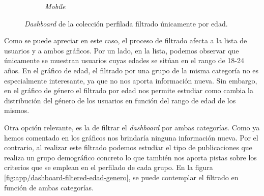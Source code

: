 \begin{figure}[H]
\begin{subfigure}{0.223\textwidth}
  \caption{\textit{Mobile}} 
  \end{subfigure}
  \caption{\textit{Dashboard} de la colección perfilada filtrado únicamente por edad.}
  \label{fig:app/dashboard-filtered}
\end{figure}

Como se puede apreciar en este caso, el proceso de filtrado afecta a la lista de usuarios y a ambos gráficos. Por un lado, en la lista, podemos observar que únicamente se muestran usuarios cuyas edades se sitúan en el rango de 18-24 años. En el gráfico de edad, el filtrado por una grupo de la misma categoría no es especialmente interesante, ya que no nos aporta información nueva. Sin embargo, en el gráfico de género el filtrado por edad nos permite estudiar como cambia la distribución del género de los usuarios en función del rango de edad de los mismos.

Otra opción relevante, es la de filtrar el \textit{dashboard} por ambas categorías. Como ya hemos comentado en los gráficos nos brindaría ninguna información nueva. Por el contrario, al realizar este filtrado podemos estudiar el tipo de publicaciones que realiza un grupo demográfico concreto lo que también nos aporta pistas sobre los criterios que se emplean en el perfilado de cada grupo. En la figura \ref{fig:app/dashboard-filtered-edad-genero}, se puede contemplar el filtrado en función de ambas categorías.

